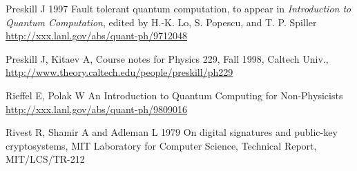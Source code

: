 \documentclass{article}
\begin{document}
\begin{thebibliography}{12}






Preskill J 1997
Fault tolerant quantum computation,
to appear in {\it Introduction to Quantum
Computation},  edited by H.-K. Lo, S. Popescu, and T. P. Spiller
\hyperref{http://xxx.lanl.gov/abs/quant-ph/9712048}{}{}
{http://xxx.lanl.gov/abs/quant-ph/9712048}

Preskill J, Kitaev A, Course notes for Physics 229, Fall 1998, Caltech Univ.,
\hyperref{http://www.theory.caltech.edu/people/preskill/ph229}{}{}
{http://www.theory.caltech.edu/people/preskill/ph229}


% 
% 
% 
% 
% 
% 
% 

Rieffel E, Polak W
An Introduction to Quantum Computing for Non-Physicists
\hyperref{http://xxx.lanl.gov/abs/quant-ph/9809016}{}{}
{http://xxx.lanl.gov/abs/quant-ph/9809016}


Rivest R, Shamir A and Adleman L 1979
On digital signatures and public-key cryptosystems,
MIT Laboratory for Computer Science, Technical Report, MIT/LCS/TR-212



\end{thebibliography}
\end{document}
